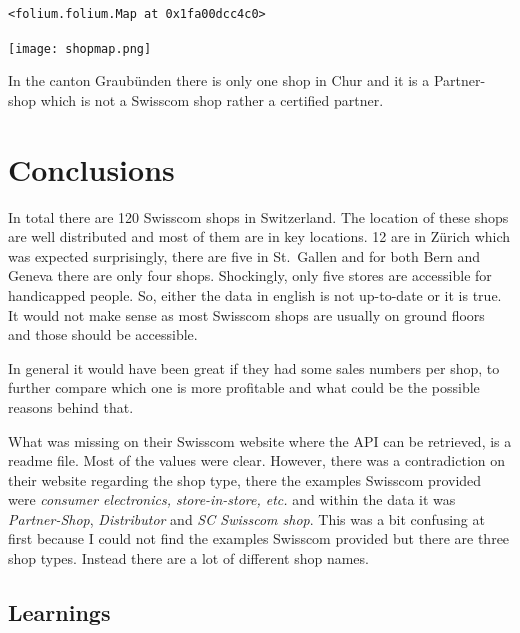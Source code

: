 \documentclass[11pt]{article}
\makeatletter
\newcommand{\boxspacing}{\kern\kvtcb@left@rule\kern\kvtcb@boxsep}
\newcommand{\prompt}[4]{
        {\ttfamily\llap{{\color{#2}[#3]:\hspace{3pt}#4}}\vspace{-\baselineskip}}
    }
\makeatother
\begin{document}
            \begin{tcolorbox}[breakable, size=fbox, boxrule=.5pt, pad at break*=1mm, opacityfill=0]
\prompt{Out}{outcolor}{41}{\boxspacing}
\begin{Verbatim}[commandchars=\\\{\}]
<folium.folium.Map at 0x1fa00dcc4c0>
\end{Verbatim}
\end{tcolorbox}

\texttt{[image: shopmap.png]}
        
    In the canton Graubünden there is only one shop in Chur and it is a
Partner-shop which is not a Swisscom shop rather a certified partner.

    \hypertarget{conclusions}{%
\section{Conclusions}\label{conclusions}}

    In total there are 120 Swisscom shops in Switzerland. The location of
these shops are well distributed and most of them are in key locations.
12 are in Zürich which was expected surprisingly, there are five in
St.~Gallen and for both Bern and Geneva there are only four shops.
Shockingly, only five stores are accessible for handicapped people. So,
either the data in english is not up-to-date or it is true. It would not
make sense as most Swisscom shops are usually on ground floors and those
should be accessible.

In general it would have been great if they had some sales numbers per
shop, to further compare which one is more profitable and what could be
the possible reasons behind that.

What was missing on their Swisscom website where the API can be
retrieved, is a readme file. Most of the values were clear. However,
there was a contradiction on their website regarding the shop type,
there the examples Swisscom provided were \emph{consumer electronics,
store-in-store, etc.} and within the data it was \emph{Partner-Shop},
\emph{Distributor} and \emph{SC Swisscom shop}. This was a bit confusing
at first because I could not find the examples Swisscom provided but
there are three shop types. Instead there are a lot of different shop
names.

    \hypertarget{learnings}{%
\subsection{Learnings}\label{learnings}}
\end{document}
